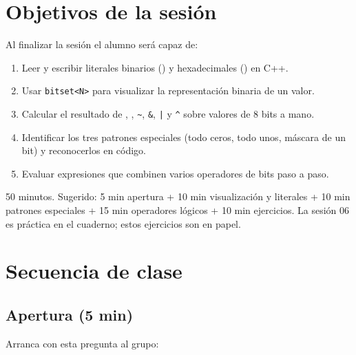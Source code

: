 \documentclass[12pt, oneside]{article}
\begin{document}

\tableofcontents
\newpage

\section{Objetivos de la sesión}

Al finalizar la sesión el alumno será capaz de:

\begin{enumerate}
  \item Leer y escribir literales binarios () y hexadecimales ()
        en C++.
  \item Usar \texttt{bitset<N>} para visualizar la representación binaria de
        un valor.
  \item Calcular el resultado de \cpp{<<}, \cpp{>>},
        \texttt{\textasciitilde}, \texttt{\&}, \texttt{|} y
        \texttt{\textasciicircum} sobre valores de 8 bits a mano.
  \item Identificar los tres patrones especiales (todo ceros, todo unos, máscara
        de un bit) y reconocerlos en código.
  \item Evaluar expresiones que combinen varios operadores de bits paso a paso.
\end{enumerate}

\begin{notaprofesor}
  50 minutos. Sugerido: 5 min apertura + 10 min visualización y literales +
  10 min patrones especiales + 15 min operadores lógicos + 10 min ejercicios.
  La sesión 06 es práctica en el cuaderno; estos ejercicios son en papel.
\end{notaprofesor}

\section{Secuencia de clase}

\subsection{Apertura (5 min)}

Arranca con esta pregunta al grupo:
\end{document}
